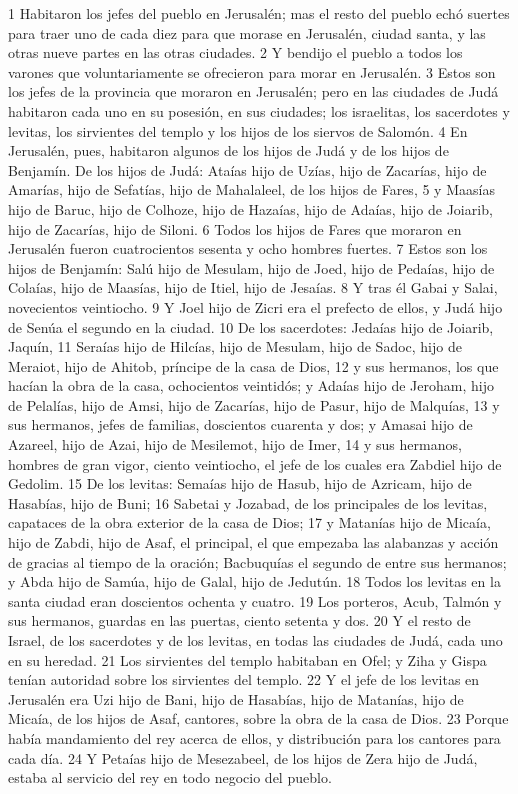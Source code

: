 1 Habitaron los jefes del pueblo en Jerusalén; mas el resto del pueblo echó suertes para traer uno de cada diez para que morase en Jerusalén, ciudad santa, y las otras nueve partes en las otras ciudades.
2 Y bendijo el pueblo a todos los varones que voluntariamente se ofrecieron para morar en Jerusalén.
3 Estos son los jefes de la provincia que moraron en Jerusalén; pero en las ciudades de Judá habitaron cada uno en su posesión, en sus ciudades; los israelitas, los sacerdotes y levitas, los sirvientes del templo y los hijos de los siervos de Salomón.
4 En Jerusalén, pues, habitaron algunos de los hijos de Judá y de los hijos de Benjamín. De los hijos de Judá: Ataías hijo de Uzías, hijo de Zacarías, hijo de Amarías, hijo de Sefatías, hijo de Mahalaleel, de los hijos de Fares,
5 y Maasías hijo de Baruc, hijo de Colhoze, hijo de Hazaías, hijo de Adaías, hijo de Joiarib, hijo de Zacarías, hijo de Siloni.
6 Todos los hijos de Fares que moraron en Jerusalén fueron cuatrocientos sesenta y ocho hombres fuertes.
7 Estos son los hijos de Benjamín: Salú hijo de Mesulam, hijo de Joed, hijo de Pedaías, hijo de Colaías, hijo de Maasías, hijo de Itiel, hijo de Jesaías.
8 Y tras él Gabai y Salai, novecientos veintiocho.
9 Y Joel hijo de Zicri era el prefecto de ellos, y Judá hijo de Senúa el segundo en la ciudad.
10 De los sacerdotes: Jedaías hijo de Joiarib, Jaquín,
11 Seraías hijo de Hilcías, hijo de Mesulam, hijo de Sadoc, hijo de Meraiot, hijo de Ahitob, príncipe de la casa de Dios,
12 y sus hermanos, los que hacían la obra de la casa, ochocientos veintidós; y Adaías hijo de Jeroham, hijo de Pelalías, hijo de Amsi, hijo de Zacarías, hijo de Pasur, hijo de Malquías,
13 y sus hermanos, jefes de familias, doscientos cuarenta y dos; y Amasai hijo de Azareel, hijo de Azai, hijo de Mesilemot, hijo de Imer,
14 y sus hermanos, hombres de gran vigor, ciento veintiocho, el jefe de los cuales era Zabdiel hijo de Gedolim.
15 De los levitas: Semaías hijo de Hasub, hijo de Azricam, hijo de Hasabías, hijo de Buni;
16 Sabetai y Jozabad, de los principales de los levitas, capataces de la obra exterior de la casa de Dios;
17 y Matanías hijo de Micaía, hijo de Zabdi, hijo de Asaf, el principal, el que empezaba las alabanzas y acción de gracias al tiempo de la oración; Bacbuquías el segundo de entre sus hermanos; y Abda hijo de Samúa, hijo de Galal, hijo de Jedutún.
18 Todos los levitas en la santa ciudad eran doscientos ochenta y cuatro.
19 Los porteros, Acub, Talmón y sus hermanos, guardas en las puertas, ciento setenta y dos. 
20 Y el resto de Israel, de los sacerdotes y de los levitas, en todas las ciudades de Judá, cada uno en su heredad.
21 Los sirvientes del templo habitaban en Ofel; y Ziha y Gispa tenían autoridad sobre los sirvientes del templo.
22 Y el jefe de los levitas en Jerusalén era Uzi hijo de Bani, hijo de Hasabías, hijo de Matanías, hijo de Micaía, de los hijos de Asaf, cantores, sobre la obra de la casa de Dios.
23 Porque había mandamiento del rey acerca de ellos, y distribución para los cantores para cada día.
24 Y Petaías hijo de Mesezabeel, de los hijos de Zera hijo de Judá, estaba al servicio del rey en todo negocio del pueblo.
